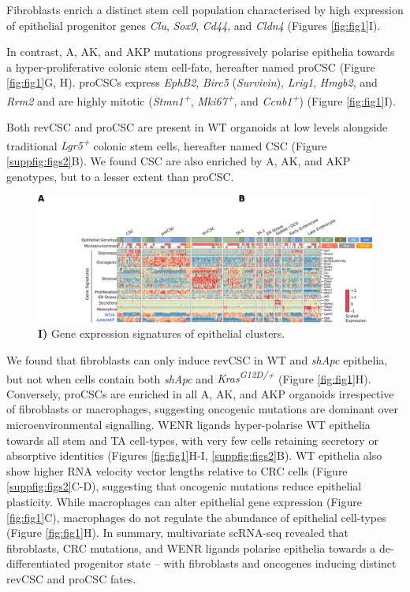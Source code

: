 Fibroblasts enrich a distinct stem cell population characterised by high expression of epithelial progenitor genes \textit{Clu}, \textit{Sox9}, \textit{Cd44}, and \textit{Cldn4} (Figures \ref{fig:fig1}I). 

In contrast, A, AK, and AKP mutations progressively polarise epithelia towards a hyper-proliferative colonic stem cell-fate, hereafter named proCSC (Figure \ref{fig:fig1}G, H). proCSCs express \textit{EphB2}, \textit{Birc5} (\textit{Survivin}), \textit{Lrig1}, \textit{Hmgb2}, and \textit{Rrm2} and are highly mitotic (\textit{Stmn1\textsuperscript{+}}, \textit{Mki67\textsuperscript{+}}, and \textit{Ccnb1\textsuperscript{+}}) (Figure \ref{fig:fig1}I). 

Both revCSC and proCSC are present in WT organoids at low levels alongside traditional \textit{Lgr5\textsuperscript{+}} colonic stem cells, hereafter named CSC (Figure \ref{suppfig:figs2}B). We found CSC are also enriched by A, AK, and AKP genotypes, but to a lesser extent than proCSC.

\begin{figure}
    \centering
    \includegraphics{04seq/figs/4SEQ_DE.png}
    \caption{\textbf{I)} Gene expression signatures of epithelial clusters.}
    \label{fig:4de}
\end{figure}


We found that fibroblasts can only induce revCSC in WT and \textit{shApc} epithelia, but not when cells contain both \textit{shApc} and \textit{Kras\textsuperscript{G12D/+}} (Figure \ref{fig:fig1}H). Conversely, proCSCs are enriched in all A, AK, and AKP organoids irrespective of fibroblasts or macrophages, suggesting oncogenic mutations are dominant over microenvironmental signalling. WENR ligands hyper-polarise WT epithelia towards all stem and TA cell-types, with very few cells retaining secretory or absorptive identities (Figures \ref{fig:fig1}H-I, \ref{suppfig:figs2}B). WT epithelia also show higher RNA velocity vector lengths relative to CRC cells (Figure \ref{suppfig:figs2}C-D), suggesting that oncogenic mutations reduce epithelial plasticity. While macrophages can alter epithelial gene expression (Figure \ref{fig:fig1}C), macrophages do not regulate the abundance of epithelial cell-types (Figure \ref{fig:fig1}H). In summary, multivariate scRNA-seq revealed that fibroblasts, CRC mutations, and WENR ligands polarise epithelia towards a de-differentiated progenitor state – with fibroblasts and oncogenes inducing distinct revCSC and proCSC fates.



